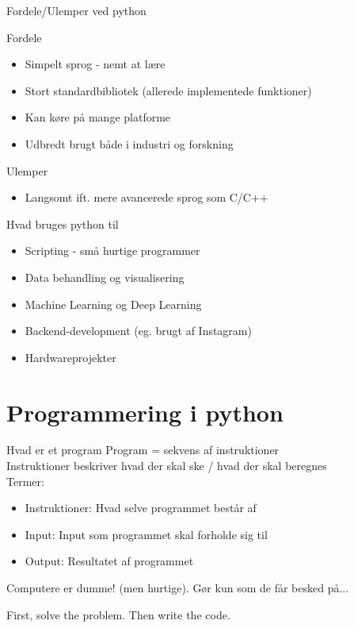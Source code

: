 \begin{frame}{Fordele/Ulemper ved python}
      \begin{exampleblock}{Fordele}
		\begin{itemize}
			\item Simpelt sprog - nemt at lære
			\item Stort standardbibliotek (allerede implementede funktioner)
			\item Kan køre på mange platforme
			\item Udbredt brugt både i industri og forskning
		\end{itemize}
      \end{exampleblock}

      \begin{alertblock}{Ulemper}
		\begin{itemize}
			\item Langsomt ift. mere avancerede sprog som C/C++
		\end{itemize}
      \end{alertblock}
\end{frame}

\begin{frame}{Hvad bruges python til}
	\begin{itemize}
		\item Scripting - små hurtige programmer
		\item Data behandling og visualisering
		\item Machine Learning og Deep Learning
		\item Backend-development (eg. brugt af Instagram)
		\item Hardwareprojekter
	\end{itemize}
\end{frame}

\section{Programmering i python}

\begin{frame}{Hvad er et program}
	Program = sekvens af instruktioner \\
	Instruktioner beskriver hvad der skal ske / hvad der skal beregnes\\
	Termer:
	\begin{itemize}
		\item Instruktioner: Hvad selve programmet består af
		\item Input: Input som programmet skal forholde sig til
		\item Output: Resultatet af programmet
	\end{itemize}

	Computere er dumme! (men hurtige). Gør kun som de får besked på...
	\vfill
	\begin{Large}
	First, solve the problem. Then write the code.
	\end{Large}
	   
\end{frame}


